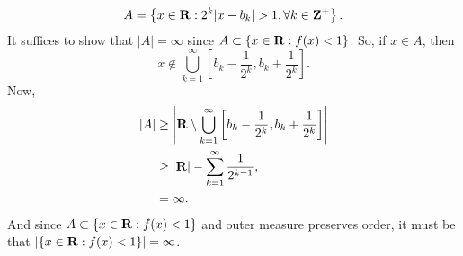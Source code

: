 \documentclass{article}
\theoremstyle{remark}
\begin{document}
\begin{enumerate}[leftmargin=*]
    \[
        A = \left\{x \in \mathbf{R}: 2^k|x-b_k| > 1, \forall k \in \mathbf{Z}^+\right\}.    
    \]
    It suffices to show that $|A| = \infty$ since $A \subset \{x \in \mathbf{R}: f(x) < 1\}$. So, if $x\in A$, then 
    \[
        x \notin \bigcup_{k=1}^\infty \left[b_k-\frac{1}{2^k}, b_k+\frac{1}{2^k}\right].    
    \]
    Now, 
    \begin{align*}
        |A| &\geq \left|\mathbf{R} \setminus \bigcup_{k=1}^\infty \left[b_k-\frac{1}{2^k}, b_k+\frac{1}{2^k}\right]\right|\\
        &\geq |\mathbf{R}| - \sum_{k=1}^\infty \frac{1}{2^{k-1}}, \\
        &= \infty.
    \end{align*}
    And since $A \subset \{x \in \mathbf{R}: f(x) < 1\}$ and outer measure preserves order, it must be that 
    $|\{x \in \mathbf{R}: f(x) < 1\}| = \infty$.
\end{enumerate}
\end{document}
